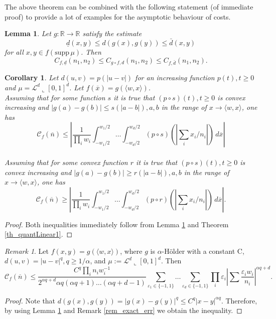 \documentclass{amsart}
\newtheorem{lemma}[theorem]{Lemma}
\newtheorem{corollary}[theorem]{Corollary}
\theoremstyle{remark}
\newtheorem{remark}[theorem]{Remark}
\numberwithin{equation}{section}
\numberwithin{figure}{section}
\newcommand{\R}{\mathbb{R}}
\def\eps{\varepsilon}
\def\supp{\mathrm{supp}\,}
\def\v{\overline}
\newcommand{\res}{\llcorner}
\begin{document}
The above theorem can be combined with the following statement (of immediate proof) to provide a lot of examples for the asymptotic behaviour of costs.

\begin{lemma}
	\label{lem_gf}
	Let $g\colon \R\to \R$ satisfy the estimate
	\[
	\underline{d} (x, y)\leq  d(g(x), g(y))\leq \bar d(x, y)
	\]
	for all $ x ,y \in f(\supp\mu)$.
	Then 
	\[
C_{f,\underline{d}} (n_1,n_2)\leq  C_{g\circ f, d}(n_1,n_2)\leq C_{f,\bar{d}} (n_1,n_2).	
	\]
\end{lemma}


\begin{corollary}
Let $d(u, v) = p(|u-v|)$ for an increasing function $p(t), t\geq 0$ and $\mu = \mathcal{L}^d\res [0,1]^d$. Let $f(\v x) = g(\langle w, x\rangle)$.
\\Assuming that for some function $s$ it is true that $(p \circ s) (t), t\geq 0$ is convex increasing and $|g(a)-g(b)|\leq s(|a-b|), a, b$ in the range of $x\to \langle w, x \rangle$, one has
\[
\mathcal{C}_f(\v n)\leq \left|\frac{1}{\prod_i w_i} \int_{-w_1/2}^{w_1/2}\ldots \int_{-w_d/2}^{w_d/2} (p\circ s)\left(\left|\sum_i x_i/n_i\right|\right)\, d\v x\right|
\]
\\Assuming that for some convex function $r$ it is true that $(p \circ s) (t), t\geq 0$ is convex increasing and $|g(a)-g(b)|\geq r(|a-b|), a, b $ in the range of $x\to \langle w, x \rangle$, one has
\[
\mathcal{C}_f(\v n)\geq \left|\frac{1}{\prod_i w_i} \int_{-w_1/2}^{w_1/2}\ldots \int_{-w_d/2}^{w_d/2} (p\circ r)\left(\left|\sum_i x_i/n_i\right|\right)\, d\v x\right|.
\]
\end{corollary}
\begin{proof}
	Both inequalities immediately follow from Lemma \ref{lem_gf} and Theorem \ref{th_quantLinear1}.
\end{proof}	
\begin{remark}
	Let $f(x, y) = g(\langle w, x \rangle)$, where $g$ is $\alpha$-H\" older with a constant C, $d(u, v) = |u-v|^q, q\geq 1/\alpha$, and $\mu:=\mathcal{L}^d\res [0,1]^d$. Then
	\[
	\mathcal{C}_f(\v n) \leq \frac{C^q \prod_i n_i w_i^{-1}}{2^{\alpha q+d} \alpha q(\alpha q+1) \ldots (\alpha q+d-1)} \sum_{\eps_1 \in \{-1, 1\}} \ldots \sum_{\eps_d \in \{-1, 1\}} \prod_i \eps_{i} \left|\sum \frac{\eps_i w_i}{n_i}\right|^{\alpha q+d}.
	\]
\end{remark}	
\begin{proof}
	Note that $d(g(x), g(y)) = |g(x)-g(y)|^q \leq C^q |x-y|^{\alpha q}$. Therefore, by using Lemma \ref{lem_gf} and Remark \ref{rem_exact_err} we obtain the inequality.	
\end{proof}	
\end{document}
